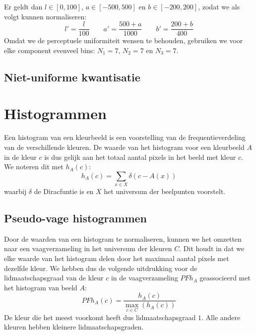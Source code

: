 Er geldt dan $l \in [0,100]$, $a \in [-500,500]$ en $b \in [-200,200]$,
zodat we als volgt kunnen normaliseren:
$$
l' = \frac{l}{100} \qquad
a' = \frac{500 + a}{1000} \qquad
b' = \frac{200 + b}{400}
$$
Omdat we de perceptuele uniformiteit wensen te behouden, gebruiken we voor elke component evenveel bins: 
$N_1=7$, $N_2=7$ en $N_3=7$.

\subsection{Niet-uniforme kwantisatie}

 


\section{Histogrammen}

Een histogram van een kleurbeeld is een voorstelling van de frequentieverdeling van de
verschillende kleuren. De waarde van het histogram voor een kleurbeeld $A$ in de kleur $c$ is
dus gelijk aan het totaal aantal pixels in het beeld met kleur $c$. We noteren dit met $h_A(c)$:
$$
h_A(c) = \sum_{x \in X} \delta (c - A(x))
$$
waarbij $\delta$ de Diracfuntie is en $X$ het universum der beelpunten voorstelt. 


\subsection{Pseudo-vage histogrammen}

Door de waarden van een histogram te normaliseren, kunnen we het omzetten naar een 
vaagverzameling in het universum der kleuren $C$. Dit houdt in dat we elke
waarde van het histogram delen door het maximaal aantal pixels met dezelfde kleur. 
We hebben dus de volgende uitdrukking voor de lidmaatschapsgraad van de kleur $c$ in de 
vaagverzameling $\mathit{PFh}_A$ geassocieerd met het histogram van beeld $A$:
$$
\mathit{PFh}_A(c) = \frac{\displaystyle h_A(c)}{\displaystyle \max_{c \in C}(h_A(c))}
$$
De kleur die het meest voorkomt heeft dus lidmaatschapsgraad $1$. Alle andere kleuren hebben
kleinere lidmaatschapsgraden.


